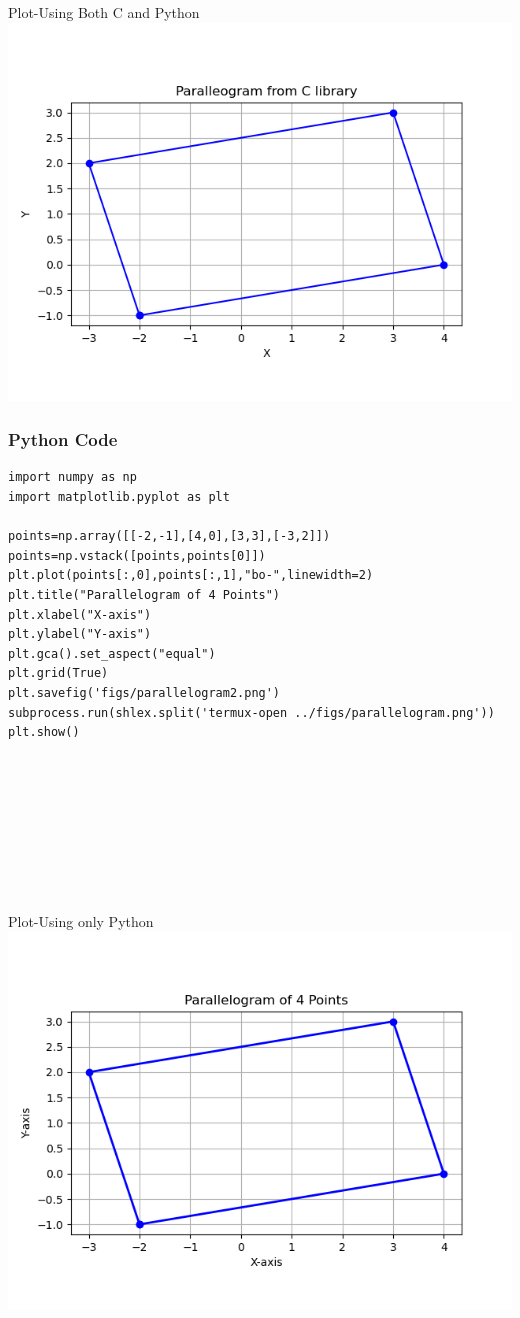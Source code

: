 \documentclass{beamer}
\begin{document}
\begin{frame}{Plot-Using Both C and Python}
    \centering
    \includegraphics[width=\columnwidth, height=0.8\textheight, keepaspectratio]{figs/parallelogram.png}     
\end{frame}

\begin{frame}[fragile]
    \frametitle{Python Code}
    \begin{lstlisting}
import numpy as np
import matplotlib.pyplot as plt

points=np.array([[-2,-1],[4,0],[3,3],[-3,2]])
points=np.vstack([points,points[0]])
plt.plot(points[:,0],points[:,1],"bo-",linewidth=2)
plt.title("Parallelogram of 4 Points")
plt.xlabel("X-axis")
plt.ylabel("Y-axis")
plt.gca().set_aspect("equal")
plt.grid(True)
plt.savefig('figs/parallelogram2.png')
subprocess.run(shlex.split('termux-open ../figs/parallelogram.png'))
plt.show()









\end{lstlisting}
\end{frame}





\begin{frame}{Plot-Using only Python}
    \centering
    \includegraphics[width=\columnwidth, height=0.8\textheight, keepaspectratio]{figs/parallelogram2.png}     
\end{frame}
\end{document}
